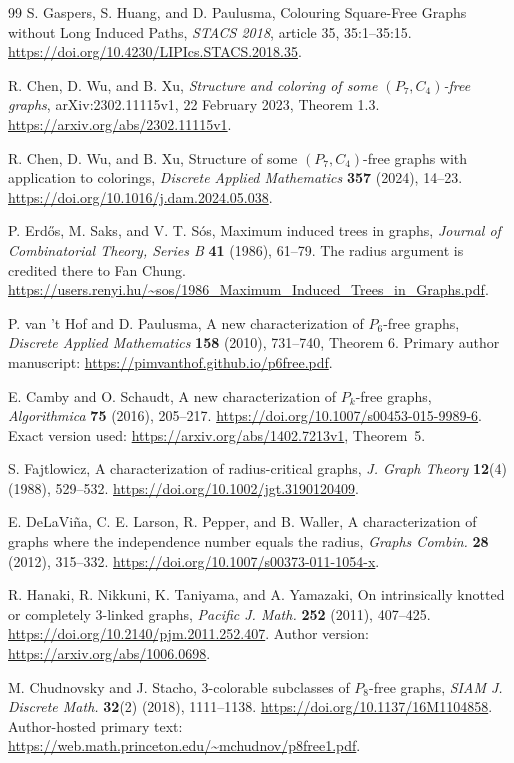 \documentclass[11pt,a4paper]{article}
\theoremstyle{definition}\newtheorem{definition}[theorem]{Definition}
\theoremstyle{remark}\newtheorem{remark}[theorem]{Remark}
\begin{document}
\begin{thebibliography}{99}
S. Gaspers, S. Huang, and D. Paulusma,
Colouring Square-Free Graphs without Long Induced Paths,
\emph{STACS 2018}, article 35, 35:1--35:15.
\url{https://doi.org/10.4230/LIPIcs.STACS.2018.35}.

R. Chen, D. Wu, and B. Xu,
\emph{Structure and coloring of some $(P_7,C_4)$-free graphs},
arXiv:2302.11115v1, 22 February 2023, Theorem 1.3.
\url{https://arxiv.org/abs/2302.11115v1}.

R. Chen, D. Wu, and B. Xu,
Structure of some $(P_7,C_4)$-free graphs with application to colorings,
\emph{Discrete Applied Mathematics} \textbf{357} (2024), 14--23.
\url{https://doi.org/10.1016/j.dam.2024.05.038}.

P. Erd\H{o}s, M. Saks, and V. T. S\'os,
Maximum induced trees in graphs,
\emph{Journal of Combinatorial Theory, Series B} \textbf{41} (1986),
61--79. The radius argument is credited there to Fan Chung.
\url{https://users.renyi.hu/~sos/1986_Maximum_Induced_Trees_in_Graphs.pdf}.

P. van 't Hof and D. Paulusma,
A new characterization of $P_6$-free graphs,
\emph{Discrete Applied Mathematics} \textbf{158} (2010), 731--740,
Theorem 6. Primary author manuscript:
\url{https://pimvanthof.github.io/p6free.pdf}.

E. Camby and O. Schaudt,
A new characterization of $P_k$-free graphs,
\emph{Algorithmica} \textbf{75} (2016), 205--217.
\url{https://doi.org/10.1007/s00453-015-9989-6}.
Exact version used: \url{https://arxiv.org/abs/1402.7213v1}, Theorem~5.

S. Fajtlowicz,
A characterization of radius-critical graphs,
\emph{J. Graph Theory} \textbf{12}(4) (1988), 529--532.
\url{https://doi.org/10.1002/jgt.3190120409}.

E. DeLaVi\~na, C. E. Larson, R. Pepper, and B. Waller,
A characterization of graphs where the independence number equals the
radius, \emph{Graphs Combin.} \textbf{28} (2012), 315--332.
\url{https://doi.org/10.1007/s00373-011-1054-x}.

R. Hanaki, R. Nikkuni, K. Taniyama, and A. Yamazaki,
On intrinsically knotted or completely 3-linked graphs,
\emph{Pacific J. Math.} \textbf{252} (2011), 407--425.
\url{https://doi.org/10.2140/pjm.2011.252.407}.
Author version: \url{https://arxiv.org/abs/1006.0698}.

M. Chudnovsky and J. Stacho,
3-colorable subclasses of $P_8$-free graphs,
\emph{SIAM J. Discrete Math.} \textbf{32}(2) (2018), 1111--1138.
\url{https://doi.org/10.1137/16M1104858}.
Author-hosted primary text:
\url{https://web.math.princeton.edu/~mchudnov/p8free1.pdf}.


\end{thebibliography}
\end{document}

